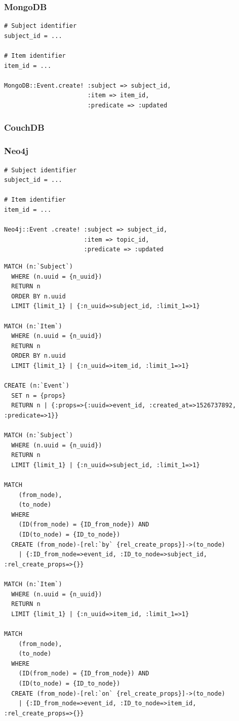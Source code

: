 \subsubsection*{MongoDB}

\begin{verbatim}
# Subject identifier
subject_id = ...

# Item identifier
item_id = ...

MongoDB::Event.create! :subject => subject_id,
                       :item => item_id,
                       :predicate => :updated
\end{verbatim}

\subsubsection*{CouchDB}


\subsubsection*{Neo4j}

\begin{verbatim}
# Subject identifier
subject_id = ...

# Item identifier
item_id = ...

Neo4j::Event .create! :subject => subject_id,
                      :item => topic_id,
                      :predicate => :updated
\end{verbatim}

\begin{verbatim}
MATCH (n:`Subject`)
  WHERE (n.uuid = {n_uuid})
  RETURN n
  ORDER BY n.uuid
  LIMIT {limit_1} | {:n_uuid=>subject_id, :limit_1=>1}

MATCH (n:`Item`)
  WHERE (n.uuid = {n_uuid})
  RETURN n
  ORDER BY n.uuid
  LIMIT {limit_1} | {:n_uuid=>item_id, :limit_1=>1}

CREATE (n:`Event`)
  SET n = {props}
  RETURN n | {:props=>{:uuid=>event_id, :created_at=>1526737892, :predicate=>1}}

MATCH (n:`Subject`)
  WHERE (n.uuid = {n_uuid})
  RETURN n
  LIMIT {limit_1} | {:n_uuid=>subject_id, :limit_1=>1}

MATCH
    (from_node),
    (to_node)
  WHERE
    (ID(from_node) = {ID_from_node}) AND
    (ID(to_node) = {ID_to_node})
  CREATE (from_node)-[rel:`by` {rel_create_props}]->(to_node)
    | {:ID_from_node=>event_id, :ID_to_node=>subject_id, :rel_create_props=>{}}

MATCH (n:`Item`)
  WHERE (n.uuid = {n_uuid})
  RETURN n
  LIMIT {limit_1} | {:n_uuid=>item_id, :limit_1=>1}

MATCH
    (from_node),
    (to_node)
  WHERE
    (ID(from_node) = {ID_from_node}) AND
    (ID(to_node) = {ID_to_node})
  CREATE (from_node)-[rel:`on` {rel_create_props}]->(to_node)
    | {:ID_from_node=>event_id, :ID_to_node=>item_id, :rel_create_props=>{}}

\end{verbatim}

